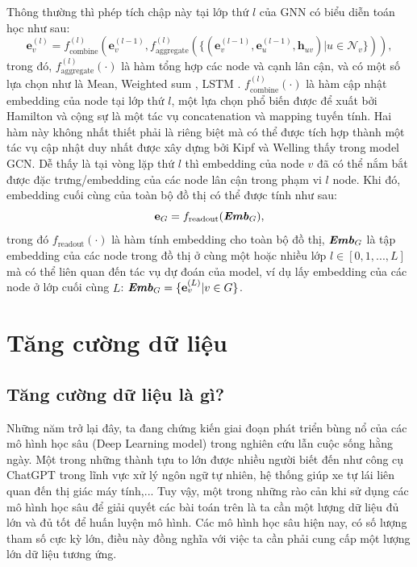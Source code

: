 Thông thường thì phép tích chập này tại lớp thứ $l$ của GNN có biểu diễn toán học \cite{review:GNN, survey:aug-for-dgl, strat-pretrain-GNN, higher-order-GNN} như sau:
\begin{equation}
    \mathbf{e}_v^{(l)} = f_{\text{combine}}^{(l)}(\mathbf{e}_v^{(l-1)}, f_{\text{aggregate}}^{(l)}(\{(\mathbf{e}_v^{(l-1)}, \mathbf{e}_u^{(l-1)}, \mathbf{h}_{uv}) | u \in \mathcal{N}_v\})),
\end{equation}
trong đó, $f_{\text{aggregate}}^{(l)}(\cdot)$ là hàm tổng hợp các node và cạnh lân cận, và có một số lựa chọn như là Mean, Weighted sum \cite{GIN}, LSTM \cite{GraphSAGE}. $f_{\text{combine}}^{(l)}(\cdot)$ là hàm cập nhật embedding của node tại lớp thứ $l$, một lựa chọn phổ biến được để xuất bởi Hamilton và cộng sự \cite{GraphSAGE} là một tác vụ concatenation và mapping tuyến tính. Hai hàm này không nhất thiết phải là riêng biệt mà có thể được tích hợp thành một tác vụ cập nhật duy nhất được xây dựng bởi Kipf và Welling \cite{GCN-model} thấy trong model GCN. Dễ thấy là tại vòng lặp thứ $l$ thì embedding của node $v$ đã có thể nắm bắt được đặc trưng/embedding của các node lân cận trong phạm vi $l$ node. Khi đó, embedding cuối cùng của toàn bộ đồ thị có thể được tính như sau:
\begin{equation}
    \mathbf{e}_G = f_{\text{readout}}(\textbf{\textit{Emb}}_G),
\end{equation}
trong đó $f_{\text{readout}}(\cdot)$ là hàm tính embedding cho toàn bộ đồ thị, $\textbf{\textit{Emb}}_G$ là tập embedding của các node trong đồ thị ở cùng một hoặc nhiều lớp $l \in [0, 1,..., L]$ mà có thể liên quan đến tác vụ dự đoán của model, ví dụ lấy embedding của các node ở lớp cuối cùng $L$: $\textbf{\textit{Emb}}_G = \{\mathbf{e}_v^{(L)} | v \in G\}$.


\section{Tăng cường dữ liệu} \label{2.3-data-aug}

\subsection{Tăng cường dữ liệu là gì?}
\noindent Những năm trở lại đây, ta đang chứng kiến giai đoạn phát triển bùng nổ của các mô hình học sâu (Deep Learning model) trong nghiên cứu lẫn cuộc sống hằng ngày. Một trong những thành tựu to lớn được nhiều người biết đến như công cụ ChatGPT trong lĩnh vực xử lý ngôn ngữ tự nhiên, hệ thống giúp xe tự lái liên quan đến thị giác máy tính,... Tuy vậy, một trong những rào cản khi sử dụng các mô hình học sâu để giải quyết các bài toán trên là ta cần một lượng dữ liệu đủ lớn và đủ tốt để huấn luyện mô hình. Các mô hình học sâu hiện nay, có số lượng tham số cực kỳ lớn, điều này đồng nghĩa với việc ta cần phải cung cấp một lượng lớn dữ liệu tương ứng.


